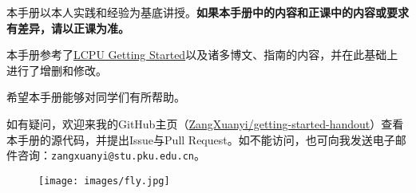 \documentclass[../main.tex]{subfiles}
\begin{document}
本手册以本人实践和经验为基底讲授。\textbf{如果本手册中的内容和正课中的内容或要求有差异，请以正课为准。}

本手册参考了\href{https://missing.lcpu.dev}{LCPU Getting Started}以及诸多博文、指南的内容，并在此基础上进行了增删和修改。

希望本手册能够对同学们有所帮助。

如有疑问，欢迎来我的GitHub主页（\faGithub\href{https://github.com/ZangXuanyi/getting-started-handout}{ZangXuanyi/getting-started-handout}）查看本手册的源代码，并提出Issue与Pull Request。如不能访问，也可向我发送电子邮件咨询：\texttt{zangxuanyi@stu.pku.edu.cn}。

\begin{figure}[ht]
  \centering
  \texttt{[image: images/fly.jpg]}
\end{figure}
\end{document}
